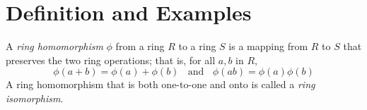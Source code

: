 \section{Definition and Examples}

\begin{definition}
	A \textit{ring homomorphism} $\phi$ from a ring $R$ to a ring $S$ is a mapping from $R$ to $S$ that preserves the two ring operations; that is, for all $a,b$ in $R$,
	\[ \phi(a + b) = \phi(a) + \phi(b)\ \ \ \ \text{and}\ \ \ \ \phi(ab) = \phi(a)\phi(b) \]
	A ring homomorphism that is both one-to-one and onto is called a \textit{ring isomorphism}.
\end{definition}
